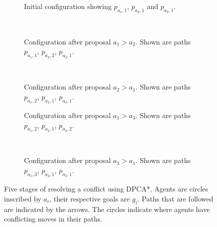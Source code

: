 \begin{figure}
    \centering
    \begin{subfigure}[t]{.3\textwidth}
        \centering
        \def\svgscale{.6}
        
        \caption{Initial configuration showing $p_{a_1,1}$, $p_{a_2,1}$ and 
            $p_{a_3,1}$.}
        \label{fig:example-initial}
    \end{subfigure}
    ~
    \begin{subfigure}[t]{.3\textwidth}
        \centering
        \def\svgscale{.6}
        
        \caption{Configuration after proposal $a_1 > a_2$. Shown are paths 
        $p_{a_1,1}$, $p_{a_2,2}$, $p_{a_3,1}$.}
        \label{fig:example2}
    \end{subfigure}
    ~
    \begin{subfigure}[t]{.3\textwidth}
        \centering
        \def\svgscale{.6}
        
        \caption{Configuration after proposal $a_2 > a_1$. Shown are paths 
        $p_{a_1,2}$, $p_{a_2,1}$, $p_{a_3,1}$.}
        \label{fig:example3}
    \end{subfigure}
    
    \begin{subfigure}[t]{.45\textwidth}
        \centering
        \def\svgscale{.6}
        
        \caption{Configuration after proposal $a_1 > a_3$. Shown are paths 
        $p_{a_1,2}$, $p_{a_2,1}$, $p_{a_3,2}$.}
        \label{fig:example4}
    \end{subfigure}
    ~
    \begin{subfigure}[t]{.45\textwidth}
        \centering
        \def\svgscale{.6}
        
        \caption{Configuration after proposal $a_3 > a_1$. Shown are paths 
        $p_{a_1,3}$, $p_{a_2,1}$, $p_{a_3,1}$.}
        \label{fig:example5}
    \end{subfigure}
    
    \caption{Five stages of resolving a conflict using DPCA*. Agents are 
    circles inscribed
        by $a_i$, their respective goals are $g_i$. Paths that are followed are
        indicated by the arrows. The circles indicate where agents have 
        conflicting moves in their paths.}
    \label{fig:example}
\end{figure}

